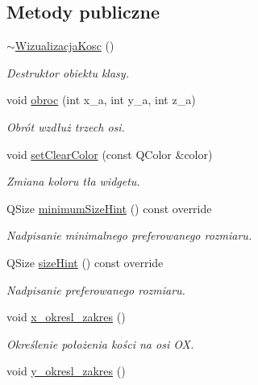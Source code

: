 \subsection*{Metody publiczne}
\begin{DoxyCompactItemize}
\item 
\hyperlink{class_wizualizacja_kosc_aa0de8f8ca522fa9e18a7040dc0f4a5f4}{$\sim$\+Wizualizacja\+Kosc} ()
\begin{DoxyCompactList}\small\item\em Destruktor obiektu klasy. \end{DoxyCompactList}\item 
void \hyperlink{class_wizualizacja_kosc_abd638267982c1c65610501551ffec3b0}{obroc} (int x\+\_\+a, int y\+\_\+a, int z\+\_\+a)
\begin{DoxyCompactList}\small\item\em Obrót wzdłuż trzech osi. \end{DoxyCompactList}\item 
void \hyperlink{class_wizualizacja_kosc_a3569ad7deb2d9462dfc2d152d9a7c4b7}{set\+Clear\+Color} (const Q\+Color \&color)
\begin{DoxyCompactList}\small\item\em Zmiana koloru tła widgetu. \end{DoxyCompactList}\item 
Q\+Size \hyperlink{class_wizualizacja_kosc_a075e8afed64bd351d12a4d363e0259ad}{minimum\+Size\+Hint} () const override
\begin{DoxyCompactList}\small\item\em Nadpisanie minimalnego preferowanego rozmiaru. \end{DoxyCompactList}\item 
Q\+Size \hyperlink{class_wizualizacja_kosc_a24b1691336c8e00a17986a947316f96d}{size\+Hint} () const override
\begin{DoxyCompactList}\small\item\em Nadpisanie preferowanego rozmiaru. \end{DoxyCompactList}\item 
void \hyperlink{class_wizualizacja_kosc_acf840c00a6d9746acad3526c5ad9dbfc}{x\+\_\+okresl\+\_\+zakres} ()
\begin{DoxyCompactList}\small\item\em Określenie położenia kości na osi OX. \end{DoxyCompactList}\item 
void \hyperlink{class_wizualizacja_kosc_af254ebd2a7a13dc033dc48881c059c4b}{y\+\_\+okresl\+\_\+zakres} ()

\end{DoxyCompactItemize}
